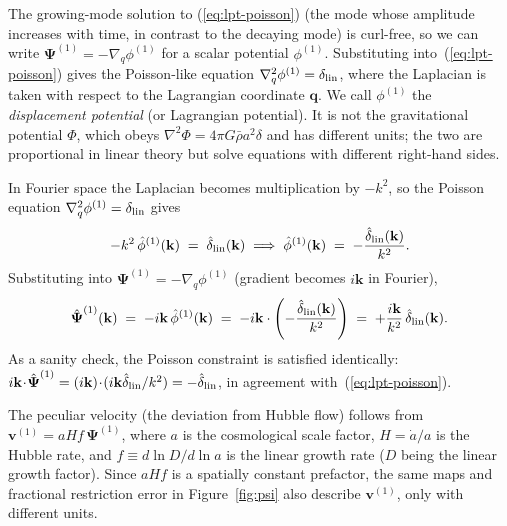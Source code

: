 \documentclass[12pt]{article}
\begin{document}
The growing-mode solution to (\ref{eq:lpt-poisson}) (the mode whose
amplitude increases with time, in contrast to the decaying mode) is
curl-free, so we can write $\boldsymbol{\Psi}^{(1)} =
-\nabla_q\phi^{(1)}$ for a scalar potential $\phi^{(1)}$. Substituting
into~(\ref{eq:lpt-poisson}) gives the Poisson-like equation
$\nabla_q^2\phi^{(1)} = \delta_{\rm lin}$, where the Laplacian is taken
with respect to the Lagrangian coordinate $\mathbf q$. We call
$\phi^{(1)}$ the \emph{displacement potential} (or Lagrangian
potential). It is not the gravitational potential $\Phi$, which obeys
$\nabla^2\Phi = 4\pi G\bar\rho a^2\delta$ and has different units; the
two are proportional in linear theory but solve equations with
different right-hand sides.

In Fourier space the Laplacian becomes multiplication by $-k^2$, so the
Poisson equation $\nabla_q^2\phi^{(1)} = \delta_{\rm lin}$ gives
\begin{equation}
  -k^2\,\hat\phi^{(1)}(\mathbf k) \;=\; \hat\delta_{\rm lin}(\mathbf k)
  \;\Longrightarrow\;
  \hat\phi^{(1)}(\mathbf k) \;=\; -\frac{\hat\delta_{\rm lin}(\mathbf k)}{k^2}.
\end{equation}
Substituting into $\boldsymbol{\Psi}^{(1)} = -\nabla_q\phi^{(1)}$
(gradient becomes $i\mathbf k$ in Fourier),
\begin{equation}\label{eq:psi-kernel}
  \hat{\boldsymbol{\Psi}}^{(1)}(\mathbf k)
  \;=\; -i\mathbf k\,\hat\phi^{(1)}(\mathbf k)
  \;=\; -i\mathbf k\cdot\left(-\frac{\hat\delta_{\rm lin}(\mathbf k)}{k^2}\right)
  \;=\; +\frac{i\mathbf k}{k^2}\,\hat\delta_{\rm lin}(\mathbf k).
\end{equation}
As a sanity check, the Poisson constraint is satisfied identically:
$i\mathbf k\!\cdot\!\hat{\boldsymbol\Psi}^{(1)} = (i\mathbf k)\!\cdot\!(i\mathbf k\hat\delta_{\rm lin}/k^2) = -\hat\delta_{\rm lin}$, in agreement with~(\ref{eq:lpt-poisson}).

The peculiar velocity (the deviation from Hubble flow) follows from
$\mathbf v^{(1)} = aHf\,\boldsymbol{\Psi}^{(1)}$, where $a$ is the
cosmological scale factor, $H=\dot a/a$ is the Hubble rate, and
$f\equiv d\ln D/d\ln a$ is the linear growth rate ($D$ being the
linear growth factor). Since $aHf$ is a spatially constant prefactor,
the same maps and fractional restriction error in
Figure~\ref{fig:psi} also describe $\mathbf v^{(1)}$, only with
different units.
\end{document}
